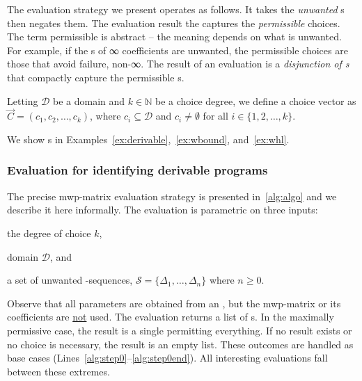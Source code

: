 The evaluation strategy we present operates as follows. It takes the
\emph{unwanted} s then negates them. The evaluation
result the captures the \emph{permissible} choices. The term permissible is
abstract -- the meaning depends on what is unwanted. For example, if the
s of ∞ coefficients are unwanted,
the permissible choices are those that avoid failure, \ie non-∞. The result of
an evaluation is a \emph{disjunction of s} that compactly
capture the permissible s.

\begin{definition}
Letting \( \mathcal{D} \) be a domain and \( k \in \mathbb{N}
\) be a choice degree, we define a choice vector as \(
\vec{C} = (c_1, c_2, \ldots, c_k) \), where \( c_i \subseteq
\mathcal{D} \) and \( c_i \neq \emptyset \) for all \( i \in \{1, 2, \ldots, k\}
\).
\end{definition}
We show s in Examples~\ref{ex:derivable},~\ref{ex:wbound},
and~\ref{ex:whl}.

\subsubsection{Evaluation for identifying derivable programs}
\label{subsec:eval}

The precise mwp-matrix evaluation strategy is presented in~\autoref{alg:algo}
and we describe it here informally. The evaluation is parametric on three
inputs:
\begin{enumerate*}[label=(\roman*)]
\item the degree of choice \(k\),
\item domain \(\mathcal{D}\), and
\item a set of unwanted -sequences, \(\mathcal{S} =
\{\Delta_1,\ldots,\Delta_n\}\) where \(n \geq 0\).
\end{enumerate*}
Observe that all parameters are obtained from an , but the
mwp-matrix or its coefficients are \underline{not} used.
The evaluation returns a list of s. In the maximally
permissive case, the result is a single  permitting
everything. If no result exists or no choice is necessary, the result is an
empty list. These outcomes are handled as base cases
(Lines~\ref{alg:step0}--\ref{alg:step0end}). All interesting evaluations fall
between these extremes.

